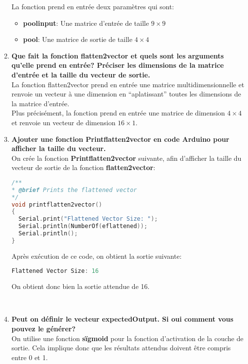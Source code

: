 \begin{enumerate}
{    La fonction prend en entrée deux paramètres qui sont:
    \begin{itemize}
      \item \textbf{poolinput}: Une matrice d'entrée de taille $9 \times 9$
      \item \textbf{pool}: Une matrice de sortie de taille $4 \times 4$ \\
    \end{itemize}
  }
  \item {
    \textbf{Que fait la fonction flatten2vector et quels sont les arguments qu'elle prend en entrée? Préciser les dimensions de 
    la matrice d'entrée et la taille du vecteur de sortie.} \vspace{0.2cm}\\ 
    La fonction flatten2vector prend en entrée une matrice multidimensionnelle et renvoie un vecteur à une dimension en ``aplatissant'' toutes les dimensions de la matrice d'entrée. \\
    Plus précisément, la fonction prend en entrée une matrice de dimension $4\times 4$ et renvoie un vecteur de dimension $16\times 1$.
  } \\
  \item {
    \textbf{Ajouter une fonction Printflatten2vector en code Arduino pour afficher la taille du vecteur.} \vspace{0.2cm} \\ 
    On crée la fonction \textbf{Printflatten2vector} suivante, afin d'afficher la taille du vecteur de sortie de la fonction \textbf{flatten2vector}:
    \begin{lstlisting}[language=C]
/**
* @brief Prints the flattened vector
*/
void printflatten2vector()
{
  Serial.print("Flattened Vector Size: ");
  Serial.println(NumberOf(eflattened));
  Serial.println();
}
    \end{lstlisting}
    Après exécution de ce code, on obtient la sortie suivante:
    \begin{lstlisting}[language=C]
Flattened Vector Size: 16
    \end{lstlisting}
    On obtient donc bien la sortie attendue de 16.
  } \\
  \item {
    \textbf{Peut on définir le vecteur expectedOutput. Si oui comment vous pouvez le générer?} \vspace{0.2cm} \\
    On utilise une fonction \textbf{sïgmoid} pour la fonction d'activation de la couche de sortie. 
    Cela implique donc que les résultats attendus doivent être compris entre 0 et 1. \\
}
\end{enumerate}
